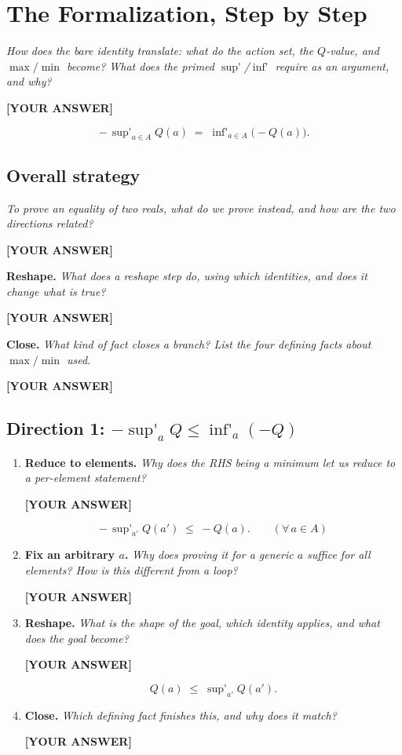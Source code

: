 \documentclass[11pt]{article}
\DeclareMathOperator*{\supp}{sup'}
\DeclareMathOperator*{\infp}{inf'}
\newcommand{\blank}{\par\vspace{2pt}\noindent\textbf{[YOUR ANSWER]}\par\vspace{6pt}}
\begin{document}
\section{The Formalization, Step by Step}

\emph{How does the bare identity translate: what do the action set, the
$Q$-value, and $\max/\min$ become? What does the primed $\supp$/$\infp$ require
as an argument, and why?}
\blank

\begin{equation}
  -\,\supp_{a \in A} Q(a) \;=\; \infp_{a \in A}\bigl(-Q(a)\bigr).
  \tag{$\star$}
\end{equation}

\subsection*{Overall strategy}

\emph{To prove an equality of two reals, what do we prove instead, and how are
the two directions related?}
\blank

\textbf{Reshape.} \emph{What does a reshape step do, using which identities, and
does it change what is true?}
\blank

\textbf{Close.} \emph{What kind of fact closes a branch? List the four defining
facts about $\max/\min$ used.}
\blank

\subsection*{Direction 1: \texorpdfstring{$-\supp_a Q \le \infp_a(-Q)$}{-sup Q <= inf(-Q)}}

\begin{enumerate}
  \item \textbf{Reduce to elements.} \emph{Why does the RHS being a minimum let
    us reduce to a per-element statement?}
    \blank
    \[
      -\,\supp_{a'} Q(a') \;\le\; -Q(a). \qquad (\forall\, a \in A)
    \]
  \item \textbf{Fix an arbitrary $a$.} \emph{Why does proving it for a generic
    $a$ suffice for all elements? How is this different from a loop?}
    \blank
  \item \textbf{Reshape.} \emph{What is the shape of the goal, which identity
    applies, and what does the goal become?}
    \blank
    \[
      Q(a) \;\le\; \supp_{a'} Q(a').
    \]
  \item \textbf{Close.} \emph{Which defining fact finishes this, and why does it
    match?}
    \blank
\end{enumerate}
\end{document}
